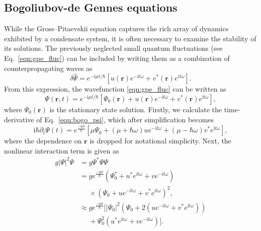 \subsection{Bogoliubov-de Gennes equations}
\label{sec:bogo}
While the Gross--Pitaevskii equation captures the rich array of dynamics exhibited by a condensate system, it is often necessary to examine the stability of its solutions. The previously neglected small quantum fluctuations (see Eq.~\eqref{eqn:gpe_fluc}) can be included by writing them as a combination of counterpropagating waves as
\begin{equation}
    \delta\hat{\Psi} = e^{{-\textrm{i}\mu t/\hbar}}[u(\mathbf{r})e^{-\textrm{i}t\omega} + v^{*}(\mathbf{r})e^{it\omega}].
\end{equation}
From this expression, the wavefunction \eqref{eqn:gpe_fluc} can be written as
\begin{equation}\label{eqn:bogo_psi}
\Psi(\mathbf{r},t) = e^{{-\textrm{i}\mu t / \hbar}}\left[\Psi_0(\mathbf{r}) + u(\mathbf{r})e^{-\textrm{i}t\omega} + v^{*}(\mathbf{r})e^{\textrm{i}t\omega} \right],
\end{equation}
where $\Psi_0(\mathbf{r})$ is the stationary state solution. Firstly, we calculate the time-derivative of Eq.~\eqref{eqn:bogo_psi}, which after simplification becomes
\begin{equation}\label{eqn:bogo_lhs}
    \textrm{i}\hbar\partial_t \Psi(t) = e^{\frac{-\textrm{i}\mu t}{\hbar}}\left[\mu\Psi_0 + (\mu+\hbar\omega)ue^{-\textrm{i}t\omega} + (\mu-\hbar\omega)v^{*}e^{\textrm{i}t\omega} \right],
\end{equation}
where the dependence on $\mathbf{r}$ is dropped for notational simplicity. Next, the nonlinear interaction term is given as
\begin{subequations}
\begin{align}\label{eqn:bogo_nonlin}
    g|\Psi|^2\Psi &= g\Psi^{*}\Psi\Psi \\
    &= g e^{\frac{-\textrm{i}\mu t}{\hbar}}(\Psi_0^{*} + u^{*}e^{\textrm{i}t\omega} + ve^{-\textrm{i}t\omega})\\ &~~~~~~\times (\Psi_0 + u e^{-\textrm{i}t\omega} + v^{*} e^{\textrm{i}t\omega})^2, \nonumber \\
    & \approx g e^{\frac{-\textrm{i}\mu t}{\hbar}}[|\Psi_0|^2(\Psi_0 + 2(u e^{-\textrm{i}t\omega} + v^{*} e^{\textrm{i}t\omega} )) \\ &~~~~~~+ \Psi_0^2( u^{*} e^{\textrm{i}t\omega} + v e^{-\textrm{i}t\omega})]. \nonumber
\end{align}
\end{subequations}
